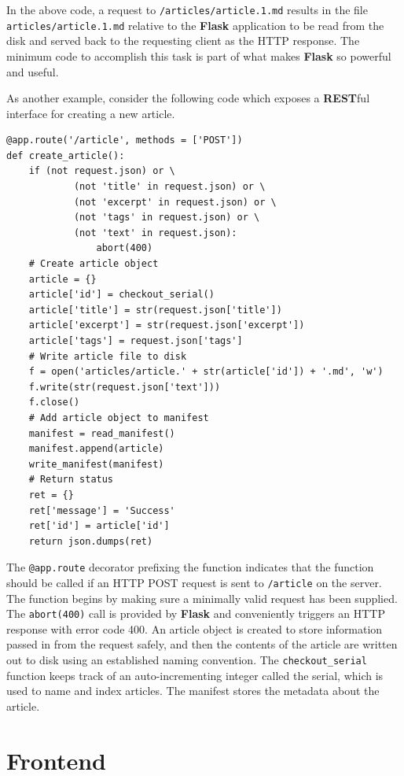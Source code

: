 \documentclass[12pt]{report}
\begin{document}
In the above code, a request to \texttt{/articles/article.1.md} results in the
file \\ \texttt{articles/article.1.md} relative to the \textbf{Flask}
application to be read from the disk and served back to the requesting client as
the HTTP response. The minimum code to accomplish this task is part of what
makes \textbf{Flask} so powerful and useful.

As another example, consider the following code which exposes a \textbf{REST}ful
interface for creating a new article.

\begin{verbatim}
@app.route('/article', methods = ['POST'])
def create_article():
    if (not request.json) or \
            (not 'title' in request.json) or \
            (not 'excerpt' in request.json) or \
            (not 'tags' in request.json) or \
            (not 'text' in request.json):
                abort(400)
    # Create article object
    article = {}
    article['id'] = checkout_serial()
    article['title'] = str(request.json['title'])
    article['excerpt'] = str(request.json['excerpt'])
    article['tags'] = request.json['tags']
    # Write article file to disk
    f = open('articles/article.' + str(article['id']) + '.md', 'w')
    f.write(str(request.json['text']))
    f.close()
    # Add article object to manifest
    manifest = read_manifest()
    manifest.append(article)
    write_manifest(manifest)
    # Return status
    ret = {}
    ret['message'] = 'Success'
    ret['id'] = article['id']
    return json.dumps(ret)
\end{verbatim}

The \texttt{@app.route} decorator prefixing the function indicates that the
function should be called if an HTTP POST request is sent to \texttt{/article}
on the server. The function begins by making sure a minimally valid request has
been supplied. The \texttt{abort(400)} call is provided by \textbf{Flask} and
conveniently triggers an HTTP response with error code 400. An article object is
created to store information passed in from the request safely, and then the
contents of the article are written out to disk using an established naming
convention. The \texttt{checkout\_serial} function keeps track of an
auto-incrementing integer called the serial, which is used to name and index
articles. The manifest stores the metadata about the article.

    \section{Frontend}
\end{document}
